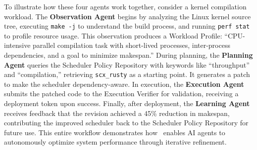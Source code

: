 To illustrate how these four agents work together, consider a kernel compilation workload. The \textbf{Observation Agent} begins by analyzing the Linux kernel source tree, executing \texttt{make -j} to understand the build process, and running \texttt{perf stat} to profile resource usage. This observation produces a Workload Profile: ``CPU-intensive parallel compilation task with short-lived processes, inter-process dependencies, and a goal to minimize makespan.'' During planning, the \textbf{Planning Agent} queries the Scheduler Policy Repository with keywords like ``throughput'' and ``compilation,'' retrieving \texttt{scx\_rusty} as a starting point. It generates a patch to make the scheduler dependency-aware. In execution, the \textbf{Execution Agent} submits the patched code to the Execution Verifier for validation, receiving a deployment token upon success. Finally, after deployment, the \textbf{Learning Agent} receives feedback that the revision achieved a 45\% reduction in makespan, contributing the improved scheduler back to the Scheduler Policy Repository for future use. This entire workflow demonstrates how \agent\ enables AI agents to autonomously optimize system performance through iterative refinement.


